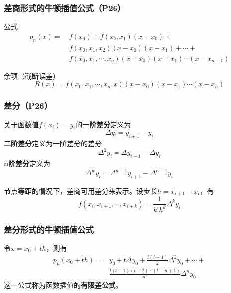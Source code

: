 \documentclass[fontset=ubuntu]{ctexart}
\numberwithin{equation}{section}
\numberwithin{theorem}{section}
\begin{document}
\begin{multicols}{2}
    \subsubsection{差商形式的牛顿插值公式（P26）}

    公式
    \begin{equation}
        \begin{split}
        p_n(x)=\ &f(x_0)+f(x_0,x_1)(x-x_0)+\\
        &f(x_0,x_1,x_2)(x-x_0)(x-x_1)+\cdots+\\
        &f(x_0,x_1,\cdots,x_n)(x-x_0)(x-x_1)\cdots (x-x_{n-1})
        \end{split}
    \end{equation}

    余项（截断误差）
    \begin{equation}
        R(x)=f(x_0,x_1,\cdots,x_n,x)(x-x_0)(x-x_1)\cdots(x-x_n)
    \end{equation}

    \subsubsection{差分（P26）}

    关于函数值$f(x_i)=y_i$的\textbf{一阶差分}定义为
    \begin{equation*}
        \Delta y_i = y_{i+1}-y_i
    \end{equation*}
    \textbf{二阶差分}定义为一阶差分的差分
    \begin{equation*}
        \Delta^2 y_i = \Delta y_{i+1}-\Delta y_i
    \end{equation*}
    \textbf{n阶差分}定义为
    \begin{equation*}
        \Delta^w y_i = \Delta^{n-1}y_{i+1}-\Delta^{n-1}y_i
    \end{equation*}

    节点等距的情况下，差商可用差分来表示。设步长$h=x_{i+1}-x_i$，有
    \begin{equation*}
        f(x_i,x_{i+1},\cdots,x_{i+k}) = \frac{1}{k!h^k}\Delta^k y_i
    \end{equation*}

    \subsubsection{差分形式的牛顿插值公式}

    令$x=x_0+th$，则有
    \begin{align*}
        p_n(x_0+th)=&y_0+t\Delta y_0+\frac{t(t-1)}{2}\Delta^2 y_0+\cdots+ \\
        &\frac{t(t-1)(t-2)\cdots(t-n+1)}{n!}\Delta^n y_0
    \end{align*}
    这一公式称为函数插值的\textbf{有限差公式}。


\end{multicols}
\end{document}
